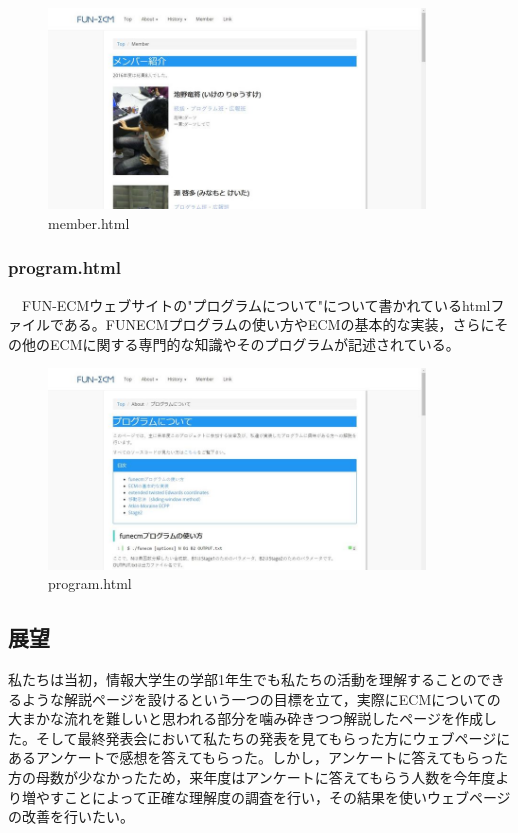 \documentclass[openany,11pt,papersize]{jsbook}
\begin{document}
\begin{figure}[H]
  \begin{center} %
    \includegraphics[clip, width=10.0cm]{./figure/member.png}
    \caption{member.html} %
    \label{member} %
  \end{center}
\end{figure}

\subsubsection{program.html}
　FUN-ECMウェブサイトの"プログラムについて"について書かれているhtmlファイルである。FUNECMプログラムの使い方やECMの基本的な実装，さらにその他のECMに関する専門的な知識やそのプログラムが記述されている。

\begin{figure}[H]
  \begin{center} %
    \includegraphics[clip, width=10.0cm]{./figure/program.png}
    \caption{program.html} %
    \label{program} %
  \end{center}
\end{figure}


\subsection{展望}
私たちは当初，情報大学生の学部1年生でも私たちの活動を理解することのできるような解説ページを設けるという一つの目標を立て，実際にECMについての大まかな流れを難しいと思われる部分を噛み砕きつつ解説したページを作成した。そして最終発表会において私たちの発表を見てもらった方にウェブページにあるアンケートで感想を答えてもらった。しかし，アンケートに答えてもらった方の母数が少なかったため，来年度はアンケートに答えてもらう人数を今年度より増やすことによって正確な理解度の調査を行い，その結果を使いウェブページの改善を行いたい。
\end{document}

